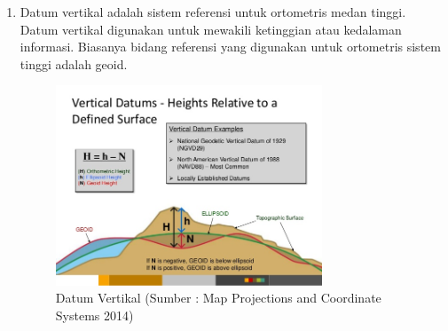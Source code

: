 \begin{enumerate}
\item Datum vertikal adalah sistem referensi untuk ortometris medan tinggi. Datum vertikal digunakan untuk mewakili ketinggian atau kedalaman informasi. Biasanya bidang referensi yang digunakan untuk ortometris sistem tinggi adalah geoid.
\begin{figure}[htbp]
		\centering
		\includegraphics[width=0.75\textwidth]{pictures/vertical_datum.jpg}
		\caption{Datum Vertikal (Sumber : Map Projections and Coordinate Systems 2014)}
		\label{Datum Vertikal}
		\end{figure}	
\end{enumerate}

